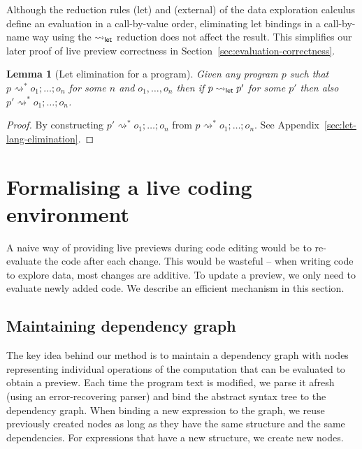 \documentclass[english,submission]{programming}
\newcounter{thc}
\theoremstyle{plain}
\newtheorem{lem}[thc]{Lemma}
\theoremstyle{definition}
\newcommand{\ident}[1]{\textnormal{\textcolor{idclr}{\sffamily #1}}}
\newcommand{\rname}[1]{{\sffamily(#1)}}
\begin{document}
\noindent
Although the reduction rules \rname{let} and \rname{external} of the data exploration calculus
define an evaluation in a call-by-value order, eliminating let bindings in a call-by-name way
using the $\rightsquigarrow_\ident{let}$ reduction does not affect the result. This
simplifies our later proof of live preview correctness in Section~\ref{sec:evaluation-correctness}.

\begin{lem}[Let elimination for a program]
\label{thm:let-lang-elimination}
Given any program $p$ such that $p \rightsquigarrow^{*} o_1;\ldots;o_n$ for some $n$ and $o_1, \ldots, o_n$
then if $p \rightsquigarrow_\ident{let} p'$ for some $p'$ then also $p' \rightsquigarrow^{*} o_1;\ldots;o_n$.
\end{lem}
\begin{proof}
By constructing $p' \rightsquigarrow^{*} o_1;\ldots;o_n$ from
$p \rightsquigarrow^{*} o_1;\ldots;o_n$. See Appendix~\ref{sec:let-lang-elimination}.
\end{proof}


\section{Formalising a live coding environment}
\label{sec:formal}

A naive way of providing live previews during code editing would be to re-evaluate the code
after each change. This would be wasteful -- when writing code to explore data, most changes are
additive. To update a preview, we only need to evaluate newly added code. We describe an
efficient mechanism in this section.


\subsection{Maintaining dependency graph}
\label{sec:formal-deps}

The key idea behind our method is to maintain a dependency graph \cite{dependencies} with
nodes representing individual operations of the computation that can be evaluated
to obtain a preview. Each time the program text is modified, we parse it afresh (using an
error-recovering parser) and bind the abstract syntax tree to the dependency graph.
When binding a new expression to the graph, we reuse previously created nodes as long as
they have the same structure and the same dependencies. For expressions that have a new
structure, we create new nodes.
\end{document}
